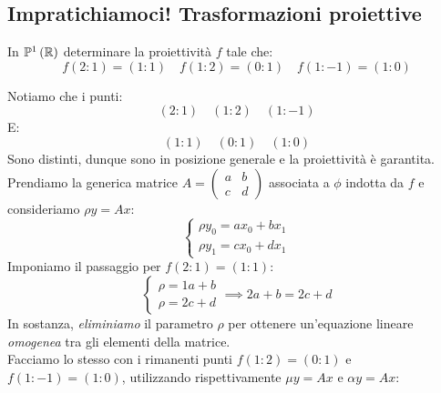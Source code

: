\subsection{Impratichiamoci! Trasformazioni proiettive}
\begin{exercise}
	In $\proj[1]{\realset}$ determinare la proiettività $f$ tale che:
	\begin{equation*}
		f\left(2\colon 1\right)=\left(1\colon1\right)\quad f\left(1\colon 2\right)=\left(0\colon1\right)\quad
		f\left(1\colon -1\right)=\left(1\colon0\right)
	\end{equation*}
\end{exercise}
\begin{solution}
Notiamo che i punti:
\begin{equation*}
	\left(2\colon 1\right)\quad\left(1\colon 2\right)\quad\left(1\colon -1\right)
\end{equation*}
E:
\begin{equation*}
		\left(1\colon 1\right)\quad\left(0\colon 1\right)\quad\left(1\colon 0\right)
\end{equation*}
Sono distinti, dunque sono in posizione generale e la proiettività è garantita. Prendiamo la generica matrice $A=\left(\begin{array}{cc}
	a & b\\
	c & d
\end{array}\right)$ associata a $\phi$ indotta da $f$ e consideriamo $\rho y=Ax$:
\begin{equation*}
	\begin{cases}
		\rho y_0=ax_0+bx_1\\
		\rho y_1=cx_0+dx_1
	\end{cases}
\end{equation*}
Imponiamo il passaggio per $f\left(2\colon 1\right)=\left(1\colon1\right)$:
\begin{equation*}
	\begin{cases}
		\rho=1a+b\\
		\rho=2c+d
	\end{cases}\implies 2a+b=2c+d
\end{equation*}
In sostanza, \textit{eliminiamo} il parametro $\rho$ per ottenere un'equazione lineare \textit{omogenea} tra gli elementi della matrice.\\
Facciamo lo stesso con i rimanenti punti $f\left(1\colon 2\right)=\left(0\colon1\right)$ e $	f\left(1\colon -1\right)=\left(1\colon0\right)$, utilizzando rispettivamente $\mu y=Ax$ e $\alpha y=Ax$:
\begin{gather*}

\end{gather*}
\end{solution}

